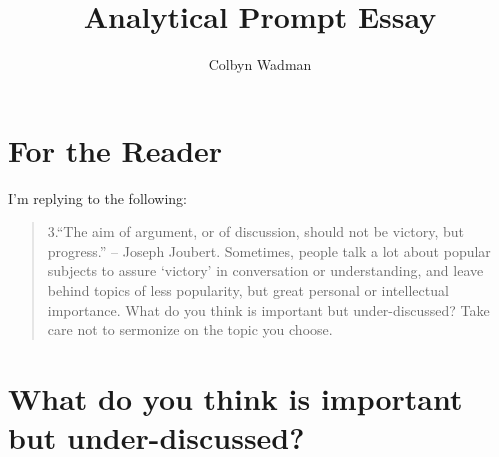 \documentclass{article}
\title{Analytical Prompt Essay}
\author{Colbyn Wadman}
\begin{document}
\maketitle

 



\section{For the Reader}

I'm replying to the following:
\begin{quotation}
3.“The aim of argument, or of discussion, should not be victory, but progress.” – Joseph Joubert. Sometimes, people talk a lot about popular subjects to assure ‘victory’ in conversation or understanding, and leave behind topics of less popularity, but great personal or intellectual importance. What do you think is important but under-discussed? Take care not to sermonize on the topic you choose. 
\end{quotation}

\section{What do you think is important but under-discussed?}



\end{document}
